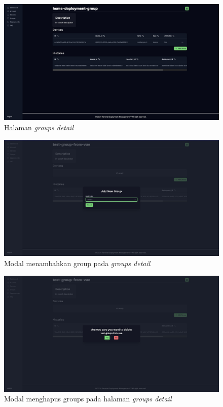 \begin{figure}
  \centering
  \includegraphics[width=1\textwidth]{resources/chapter-4/dashboard/groups-detail-page.jpg}
  \caption{Halaman \textit{groups detail}}
  \label{fig:halaman-groups-detail}
\end{figure}

\begin{figure}
  \centering
  \includegraphics[width=1\textwidth]{resources/chapter-4/dashboard/groups-detail-add-device.jpg}
  \caption{Modal menambahkan group pada \textit{groups detail}}
  \label{fig:halaman-groups-detail-add-group}
\end{figure}

\begin{figure}
  \centering
  \includegraphics[width=1\textwidth]{resources/chapter-4/dashboard/groups-detail-delete.jpg}
  \caption{Modal menghapus groups pada halaman \textit{groups detail}}
  \label{fig:halaman-groups-detail-delete}
\end{figure}

